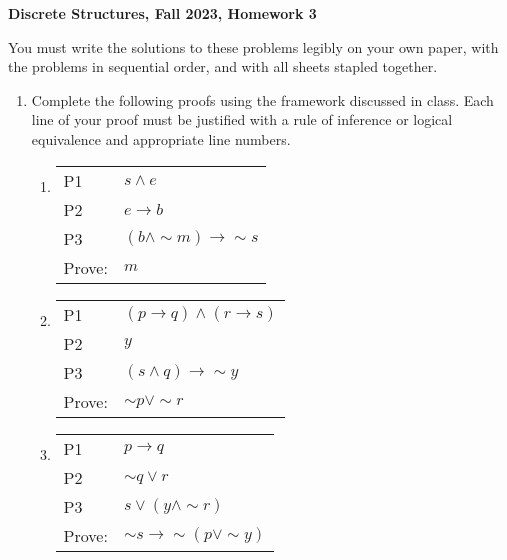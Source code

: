 \documentclass[12pt, letterpaper]{report}
\newcommand{\nott}{{\sim}}
\begin{document}
{\textbf{Discrete Structures, Fall 2023, Homework 3}}

\medbreak

You must write the solutions to these problems legibly on your own paper, with
the problems in sequential order, and with all sheets stapled together.

\begin{enumerate}

\item Complete the following proofs using the framework discussed in class.  Each line
        of your proof must be justified with a rule of inference or logical equivalence and appropriate line numbers.

\begin{enumerate}

\item
        \begin{tabular}[t]{ll}
        P1 & $s \land e$ \\
        P2 & $e \to b$ \\
        P3 & $(b \land \nott m) \to \nott s$ \\ \hline
        Prove: & $m$
        \end{tabular}           
        
                \item
                        \begin{tabular}[t]{ll}
                        P1 & $(p \to q) \land (r \to s)$ \\
                        P2 & $y$ \\
                        P3 & $(s \land q) \to \nott y$ \\ \hline
                        Prove: & $\nott p \lor \nott r$
                \end{tabular}
                
                                
                
                \item
                        \begin{tabular}[t]{ll}
                        P1 & $p \to q$ \\
                        P2 & $\nott q \lor r$ \\
                        P3 & $s \lor (y \land \nott r)$ \\ \hline
                        Prove: & $\nott s \to \nott (p \lor \nott y)$
                \end{tabular}
                

\end{enumerate}
\end{enumerate}
\end{document}

